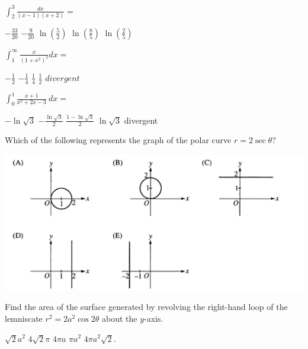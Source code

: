 \begin{questions}
\question[2] $\int_2^3 \frac{dx}{(x-1)(x+2)} = $

    \begin{oneparchoices}
    \choice  $-\frac{33}{20}$
    \choice  $-\frac{9}{20}$
    \choice  $\ln(\frac{5}{2})$
    \CorrectChoice $\ln(\frac{8}{5})$
    \choice $\ln(\frac{2}{5})$
    \end{oneparchoices}

\question[2] $\int_1^\infty \frac{x}{(1+x^2)^2} dx = $

    \begin{oneparchoices}
    \choice  $-\frac{1}{2}$
    \choice  $-\frac{1}{4}$
    \CorrectChoice  $\frac{1}{4}$
    \choice $\frac{1}{2}$
    \choice $divergent$
    \end{oneparchoices}

\question[2] $\int_0^1 \frac{x+1}{x^2 + 2x - 3}\ dx = $

    \begin{oneparchoices}
    \choice $-\ln \sqrt{3}$
    \choice $-\frac{\ln \sqrt{3}}{2}$ 
    \choice $\frac{1 - \ln \sqrt{3}}{2}$ 
    \choice $\ln \sqrt{3}$ 
    \CorrectChoice divergent 
    \end{oneparchoices}

\question[2] Which of the following represents the graph of the polar
    curve $r = 2\sec \theta$?

    \includegraphics[scale=0.7]{BC5.png}    

\question[2] Find the area of the surface generated by revolving the
right-hand loop of the lemniscate $r^2 = 2a^2 \cos 2\theta$ about the
$y$-axis.
    \begin{oneparchoices}
    \choice $\sqrt{2} a^2$
    \choice $4\sqrt{2} \pi$ 
    \choice $4\pi a$ 
    \choice $\pi a^2$ 
    \CorrectChoice $4\pi a^2\sqrt{2}.$ 
    \end{oneparchoices}


\end{questions}
